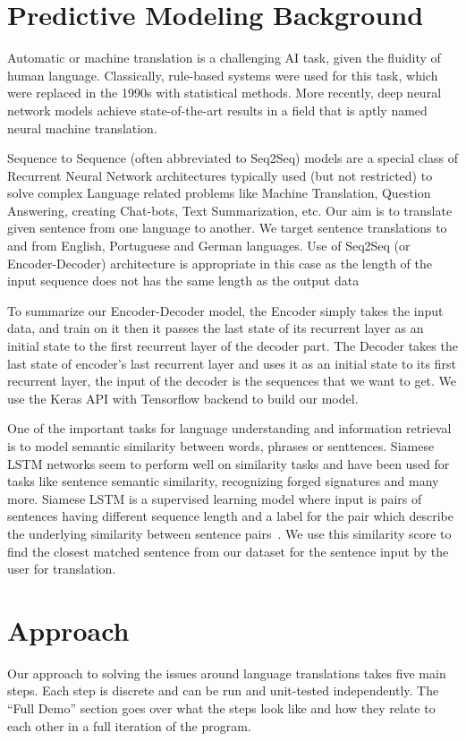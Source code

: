 \documentclass[runningheads]{llncs}
\begin{document}
	\section{Predictive Modeling Background}
	Automatic or machine translation is a challenging AI task, given the fluidity of human language. Classically, rule-based systems were used for this task, which were replaced in the 1990s with statistical methods. More recently, deep neural network models achieve state-of-the-art results in a field that is aptly named neural machine translation. ~\cite{ref_url16}
	
	Sequence to Sequence (often abbreviated to Seq2Seq) models are a special class of Recurrent Neural Network architectures typically used (but not restricted) to solve complex Language related problems like Machine Translation, Question Answering, creating Chat-bots, Text Summarization, etc. Our aim is to translate given sentence from one language to another. We target sentence translations to and from English, Portuguese and German languages. Use of Seq2Seq (or Encoder-Decoder) architecture is appropriate in this case as the length of the input sequence  does not has the same length as the output data
	
	To summarize our Encoder-Decoder model, the Encoder simply takes the input data, and train on it then it passes the last state of its recurrent layer as an initial state to the first recurrent layer of the decoder part. The Decoder takes the last state of encoder’s last recurrent layer and uses it as an initial state to its first recurrent layer, the input of the decoder is the sequences that we want to get. We use the Keras API with Tensorflow backend to build our model.
	
	One of the important tasks for language understanding and information retrieval is to model semantic similarity between words, phrases or senttences. Siamese LSTM networks seem to perform well on similarity tasks and have been used for tasks like sentence semantic similarity, recognizing forged signatures and many more.
	Siamese LSTM is a supervised learning model where input is pairs of sentences having different sequence length and a label for the pair which describe the underlying similarity between sentence pairs~\cite{ref_url21}. We use this similarity score to find the closest matched sentence from our dataset for the sentence input by the user for translation.
	
	
	\section{Approach}
	Our approach to solving the issues around language translations takes five main steps. Each step is discrete and can be run and unit-tested independently. The ``Full Demo'' section goes over what the steps look like and how they relate to each other in a full iteration of the program. 
	
\end{document}
